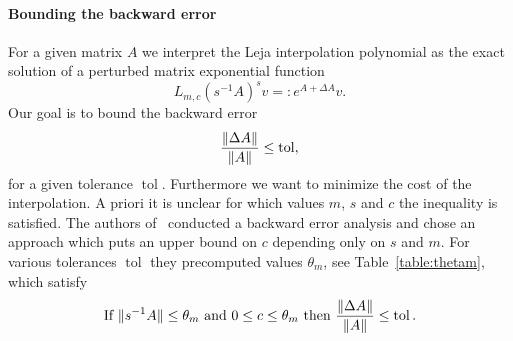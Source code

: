 \documentclass{scrartcl}
\newcommand{\eqdefn}{=\mathrel{\mathop:}}
\begin{document}
	\paragraph{Bounding the backward error} For a given matrix $A$ we interpret the Leja interpolation polynomial as the exact solution of a perturbed matrix exponential function
	\[
	L_{m,c}(s^{-1}A)^sv \eqdefn e^{A + \Delta A}v.
	\]
	Our goal is to bound the backward error 
	\[
	\frac{\lVert\Delta A\rVert}{\lVert A\rVert} \le \operatorname{tol}, 
	\]
	for a given tolerance $\operatorname{tol}$. Furthermore we want to minimize the cost of the interpolation. A priori it is unclear for which values $m$, $s$ and $c$ the inequality is satisfied. The authors of~\cite{lejarev} conducted a backward error analysis and chose an approach which puts an upper bound on $c$ depending only on $s$ and $m$. For various tolerances $\operatorname{tol}$ they precomputed values $\theta_m$, see Table~\ref{table:thetam}, which satisfy
	\begin{align*}
	\text{If}\ \lVert s^{-1}A\rVert\le \theta_m\ \text{and}\ 0 \le c \le \theta_m\ \text{then}\ \frac{\lVert\Delta A\rVert}{\lVert A\rVert} \le \operatorname{tol}.
	\end{align*}
\end{document}
